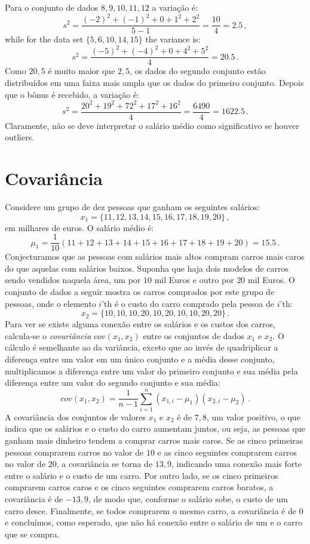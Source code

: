 Para o conjunto de dados $ 8,9,10,11,12$ a variação é:
\[
s^2 = \frac{(-2)^2+(-1)^2+0+1^2+2^2}{5-1} = \frac{10}{4} = 2.5\,,
\]
while for the data set $\{5,6,10,14,15\}$ the variance is:
\[
s^2 = \frac{(-5)^2+(-4)^2+0+4^2+5^2}{4} = 20.5\,.
\]
Como $20,5$ é muito maior que $2,5$, os dados do segundo conjunto estão distribuídos em uma faixa mais ampla que os dados do primeiro conjunto. Depois que o bônus é recebido, a variação é:
\[
s^2 = \frac{20^2+19^2+72^2+17^2+16^2}{4} = \frac{6490}{4} = 1622.5\,.
\]
Claramente, não se deve interpretar o salário médio como significativo se houver outliers.

\section{Covariância}\label{a.covariance}

Considere um grupo de dez pessoas que ganham os seguintes salários:
\[x_1=\{11,12,13,14,15,16,17,18,19,20\}\,,
\]
em milhares de euros. O salário médio é:
\[
\mu_1=\frac{1}{10}(11+12+13+14+15+16+17+18+19+20)=15.5\,.
\]
Conjecturamos que as pessoas com salários mais altos compram carros mais caros do que aquelas com salários baixos. Suponha que haja dois modelos de carros sendo vendidos naquela área, um por $10$ mil Euros e outro por $20$ mil Euros. O conjunto de dados a seguir mostra os carros comprados por este grupo de pessoas, onde o elemento $i$'th é o custo do carro comprado pela pessoa de $i$'th:
\[
x_2=\{10,10,10,20,10,20,10,10,20,20\}\,.
\]
Para ver se existe alguma conexão entre os salários e os custos dos carros, calcula-se o \emph{covariância} $\textit{cov}(x_1,x_2)$ entre os conjuntos de dados $x_1$ e $x_2$. O cálculo é semelhante ao da variância, exceto que ao invés de quadriplicar a diferença entre um valor em um único conjunto e a média desse conjunto, multiplicamos a diferença entre um valor do primeiro conjunto e sua média pela diferença entre um valor do segundo conjunto e sua média:
\[
\textit{cov}(x_1,x_2) = \frac{1}{n-1}\sum^n_{i=1} (x_{1,i}-\mu_1)(x_{2,i}-\mu_2)\,.\label{eq.cov}
\]
A covariância dos conjuntos de valores $x_1$ e $x_2$ é de $7,8$, um valor positivo, o que indica que os salários e o custo do carro aumentam juntos, ou seja, as pessoas que ganham mais dinheiro tendem a comprar carros mais caros. Se as cinco primeiras pessoas comprarem carros no valor de $10$ e as cinco seguintes comprarem carros no valor de $20$, a covariância se torna de $13,9$, indicando uma conexão mais forte entre o salário e o custo de um carro. Por outro lado, se os cinco primeiros comprarem carros caros e os cinco seguintes comprarem carros baratos, a covariância é de $-13,9$, de modo que, conforme o salário sobe, o custo de um carro desce. Finalmente, se todos comprarem o mesmo carro, a covariância é de $0$ e concluímos, como esperado, que não há conexão entre o salário de um e o carro que se compra.

